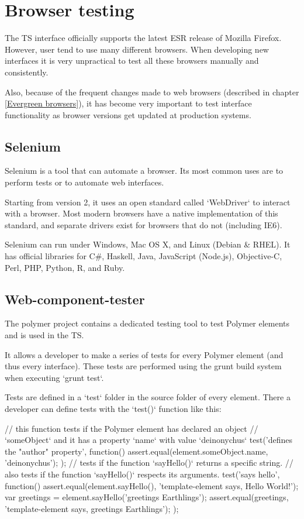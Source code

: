 \chapter{Browser testing}
The TS interface officially supports the latest ESR release of Mozilla Firefox.
However, user tend to use many different browsers. When developing new interfaces
it is very unpractical to test all these browsers manually and consistently.

Also, because of the frequent changes made to web browsers (described in chapter \ref{Evergreen browsers}),
it has become very important to test interface functionality as browser versions
get updated at production systems.

\section{Selenium}
Selenium is a tool that can automate a browser. Its most common uses are to
perform tests or to automate web interfaces.

Starting from version 2, it uses an open standard called `WebDriver` to interact
with a browser. Most modern browsers have a native implementation of this standard,
and separate drivers exist for browsers that do not (including IE6).

Selenium can run under Windows, Mac OS X, and Linux (Debian \& RHEL).
It has official libraries for C#, Haskell, Java, JavaScript (Node.js), Objective-C,
Perl, PHP, Python, R, and Ruby.

\section{Web-component-tester}
The polymer project contains a dedicated testing tool to test Polymer elements and
is used in the TS.

It allows a developer to make a series of tests for every Polymer element (and thus
every interface). These tests are performed using the grunt build system when
executing `grunt test`.

Tests are defined in a `test` folder in the source folder of every element.
There a developer can define tests with the `test()` function like this:

\begin{pyglist}[language=javascript,numbers=left,numbersep=5pt,fontsize=\small]
// this function tests if the Polymer element has declared an object
// `someObject` and it has a property `name` with value `deinonychus`
test('defines the "author" property', function() {
    assert.equal(element.someObject.name, 'deinonychus');
});
// tests if the function `sayHello()` returns a specific string.
// also tests if the function `sayHello()` respects its arguments.
test('says hello', function() {
    assert.equal(element.sayHello(), 'template-element says, Hello World!');
    var greetings = element.sayHello('greetings Earthlings');
    assert.equal(greetings, 'template-element says, greetings Earthlings');
});
\end{pyglist}

